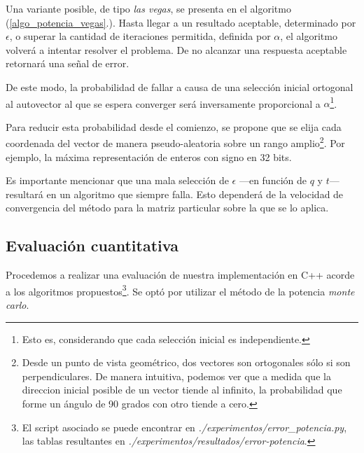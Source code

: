 \vspace{1em}
Una variante posible, de tipo \textit{las vegas}, se presenta en el algoritmo (\ref{algo_potencia_vegas}.). Hasta llegar a un resultado aceptable, determinado por $\epsilon$, o superar la cantidad de iteraciones permitida, definida por $\alpha$, el algoritmo volverá a intentar resolver el problema. De no alcanzar una respuesta aceptable retornará una señal de error. 

De este modo, la probabilidad de fallar a causa de una selección inicial ortogonal al autovector al que se espera converger será inversamente proporcional a $\alpha$\footnote{Esto es, considerando que cada selección inicial es independiente.}. 

\vspace{1em}
Para reducir esta probabilidad desde el comienzo, se propone que se elija cada coordenada del vector de manera pseudo-aleatoria sobre un rango amplio\footnote{Desde un punto de vista geométrico, dos vectores son ortogonales sólo si son perpendiculares. De manera intuitiva, podemos ver que a medida que la direccion inicial posible de un vector tiende al infinito, la probabilidad que forme un ángulo de 90 grados con otro tiende a cero.}. Por ejemplo, la máxima representación de enteros con signo en 32 bits. 

\vspace{1em}


\vspace{1em}
Es importante mencionar que una mala selección de $\epsilon$ ---en función de $q$ y $t$--- resultará en un algoritmo que siempre falla. Esto dependerá de la velocidad de convergencia del método para la matriz particular sobre la que se lo aplica.  




\vspace{2em}
\subsection{Evaluación cuantitativa} Procedemos a realizar una evaluación de nuestra implementación en C++ acorde a los algoritmos propuestos\footnote{El script asociado se puede encontrar en \textit{./experimentos/error\_potencia.py}, las tablas resultantes en \textit{./experimentos/resultados/error-potencia}.}. Se optó por utilizar el método de la potencia \textit{monte carlo}.

